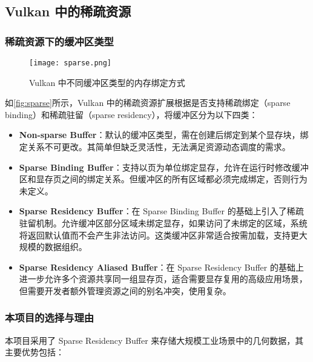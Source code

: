 \cleardoublepage

{

    \appendixsubsecmajornumbering

    \subsection{Vulkan 中的稀疏资源}
    \label{appendix:sparse}

    \subsubsection{稀疏资源下的缓冲区类型}

    \begin{figure}[htbp]
        \centering
        \texttt{[image: sparse.png]}
        \caption{\label{fig:sparse}Vulkan 中不同缓冲区类型的内存绑定方式}
    \end{figure}
    
    如\autoref{fig:sparse}所示，Vulkan 中的稀疏资源扩展根据是否支持稀疏绑定（sparse binding）和稀疏驻留（sparse residency），将缓冲区分为以下四类：

    \begin{itemize}
        \item \textbf{Non-sparse Buffer}：默认的缓冲区类型，需在创建后绑定到某个显存块，绑定关系不可更改。其简单但缺乏灵活性，无法满足资源动态调度的需求。
        
        \item \textbf{Sparse Binding Buffer}：支持以页为单位绑定显存，允许在运行时修改缓冲区和显存页之间的绑定关系。但缓冲区的所有区域都必须完成绑定，否则行为未定义。
        
        \item \textbf{Sparse Residency Buffer}：在 Sparse Binding Buffer 的基础上引入了稀疏驻留机制。允许缓冲区部分区域未绑定显存，如果访问了未绑定的区域，系统将返回默认值而不会产生非法访问。这类缓冲区非常适合按需加载，支持更大规模的数据组织。
        
        \item \textbf{Sparse Residency Aliased Buffer}：在 Sparse Residency Buffer 的基础上进一步允许多个资源共享同一组显存页，适合需要显存复用的高级应用场景，但需要开发者额外管理资源之间的别名冲突，使用复杂。
    \end{itemize}

    \subsubsection{本项目的选择与理由}
    本项目采用了 Sparse Residency Buffer 来存储大规模工业场景中的几何数据，其主要优势包括：

}
